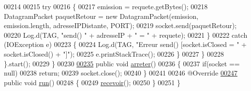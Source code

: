\begin{DoxyCode}
00214 
00215                 \textcolor{keywordflow}{try}
00216                 \{
00217                     emission = requete.getBytes();
00218                     DatagramPacket paquetRetour = \textcolor{keyword}{new} DatagramPacket(emission, emission.length, 
      adresseIPDistante, PORT);
00219                     socket.send(paquetRetour);
00220                     Log.d(TAG, \textcolor{stringliteral}{"send() "} + adresseIP + \textcolor{stringliteral}{" = "} + requete);
00221                 \}
00222                 \textcolor{keywordflow}{catch} (IOException e)
00223                 \{
00224                     Log.d(TAG, \textcolor{stringliteral}{"Erreur send() [socket.isClosed = "} + socket.isClosed() + \textcolor{stringliteral}{"]"});
00225                     e.printStackTrace();
00226                 \}
00227             \}
00228         \}.start();
00229     \}
00230 
\hyperlink{classcom_1_1lasalle_1_1meeting_1_1_communication_abf23e6b879122267b3fe10233b4010a8}{00235}     \textcolor{keyword}{public} \textcolor{keywordtype}{void} \hyperlink{classcom_1_1lasalle_1_1meeting_1_1_communication_abf23e6b879122267b3fe10233b4010a8}{arreter}()
00236     \{
00237         \textcolor{keywordflow}{if}(socket == null)
00238             \textcolor{keywordflow}{return};
00239         socket.close();
00240     \}
00241 
00246     @Override
\hyperlink{classcom_1_1lasalle_1_1meeting_1_1_communication_afe29bde1b4538990bd0a8c9b2d512efa}{00247}     \textcolor{keyword}{public} \textcolor{keywordtype}{void} \hyperlink{classcom_1_1lasalle_1_1meeting_1_1_communication_afe29bde1b4538990bd0a8c9b2d512efa}{run}()
00248     \{
00249         \hyperlink{classcom_1_1lasalle_1_1meeting_1_1_communication_a0344b79faa04dded3468fb8dda6baa81}{recevoir}();
00250     \}
00251 \}
\end{DoxyCode}
